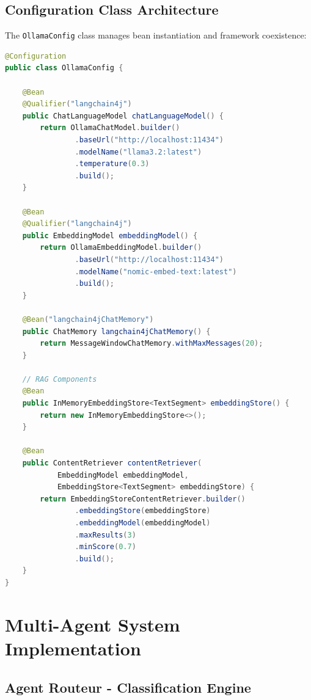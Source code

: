 \documentclass[12pt,a4paper]{article}
\begin{document}
\subsection{Configuration Class Architecture}

The \texttt{OllamaConfig} class manages bean instantiation and framework coexistence:

\begin{lstlisting}[language=java, caption=OllamaConfig.java - Dual Framework Configuration]
@Configuration
public class OllamaConfig {

    @Bean
    @Qualifier("langchain4j")
    public ChatLanguageModel chatLanguageModel() {
        return OllamaChatModel.builder()
                .baseUrl("http://localhost:11434")
                .modelName("llama3.2:latest")
                .temperature(0.3)
                .build();
    }

    @Bean  
    @Qualifier("langchain4j")
    public EmbeddingModel embeddingModel() {
        return OllamaEmbeddingModel.builder()
                .baseUrl("http://localhost:11434")
                .modelName("nomic-embed-text:latest")
                .build();
    }

    @Bean("langchain4jChatMemory")
    public ChatMemory langchain4jChatMemory() {
        return MessageWindowChatMemory.withMaxMessages(20);
    }

    // RAG Components
    @Bean
    public InMemoryEmbeddingStore<TextSegment> embeddingStore() {
        return new InMemoryEmbeddingStore<>();
    }

    @Bean
    public ContentRetriever contentRetriever(
            EmbeddingModel embeddingModel,
            EmbeddingStore<TextSegment> embeddingStore) {
        return EmbeddingStoreContentRetriever.builder()
                .embeddingStore(embeddingStore)
                .embeddingModel(embeddingModel)
                .maxResults(3)
                .minScore(0.7)
                .build();
    }
}
\end{lstlisting}

\section{Multi-Agent System Implementation}

\subsection{Agent Routeur - Classification Engine}
\end{document}

